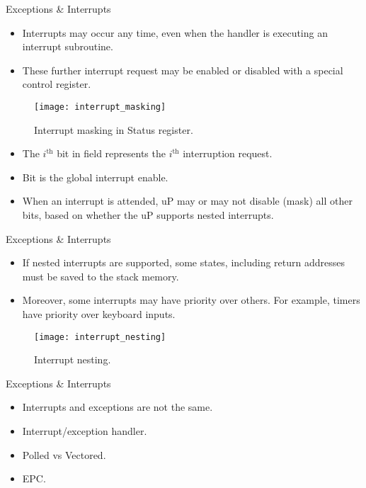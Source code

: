 % 
\begin{frame}{Exceptions \& Interrupts}{}
\begin{itemize}
\item Interrupts may occur any time, even when the handler is executing an interrupt subroutine.
\item These further interrupt request may be enabled or disabled with a special control register.
\end{itemize}
\begin{figure}
\centering
\texttt{[image: interrupt\_masking]}
\caption{Interrupt masking in Status register.}
\label{Figure:interrupt_masking}
\end{figure}
\begin{itemize}
\item The $i^{\mathrm{th}}$ bit in  field represents the  $i^{\mathrm{th}}$ interruption request.
\item Bit  is the global interrupt enable.
\item When an interrupt is attended, \ac{uP} may or may not disable (mask) all other  bits, based on whether the \ac{uP} supports nested interrupts.
\end{itemize}
\end{frame}
% 
\begin{frame}{Exceptions \& Interrupts}{}
\begin{itemize}
\item If nested interrupts are supported, some states, including return addresses must be saved to the stack memory.
\item Moreover, some interrupts may have priority over others. For example, timers have priority over keyboard inputs.
\end{itemize}
\begin{figure}
\centering
\texttt{[image: interrupt\_nesting]}
\caption{Interrupt nesting.}
\label{Figure:interrupt_nesting}
\end{figure}
\end{frame}

% 
\begin{frame}{Exceptions \& Interrupts}{}
\begin{itemize}
\item Interrupts and exceptions are not the same.
\item Interrupt/exception handler.
\item Polled vs Vectored.
\item \ac{EPC}.
\end{itemize}
\end{frame}

